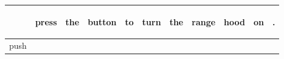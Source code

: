\documentclass[landscape]{article}
\newcommand{\ssp}{\hspace{2pt}}
\begin{document}
\noindent\begin{tabular}{|l|p{10pt}|p{10pt}|p{10pt}|p{10pt}|p{10pt}|p{10pt}|p{10pt}|p{10pt}|p{10pt}|p{10pt}|}
\hline
&\begin{sideways}\cellcolor{ref0}press\hspace{12pt}\end{sideways}&\begin{sideways}\cellcolor{ref1}the\hspace{12pt}\end{sideways}&\begin{sideways}\cellcolor{ref2}button\hspace{12pt}\end{sideways}&\begin{sideways}\cellcolor{ref3}to\hspace{12pt}\end{sideways}&\begin{sideways}\cellcolor{ref4}turn\hspace{12pt}\end{sideways}&\begin{sideways}\cellcolor{ref5}the\hspace{12pt}\end{sideways}&\begin{sideways}\cellcolor{ref6}range\hspace{12pt}\end{sideways}&\begin{sideways}\cellcolor{ref7}hood\hspace{12pt}\end{sideways}&\begin{sideways}\cellcolor{ref8}on\hspace{12pt}\end{sideways}&\begin{sideways}\cellcolor{ref9}.\hspace{12pt}\end{sideways}\\
\hline
\ssp push \ssp&\hspace{2pt}&\hspace{2pt}&\hspace{2pt}&\hspace{2pt}&\hspace{2pt}&\hspace{2pt}&\hspace{2pt}&\hspace{2pt}&\hspace{2pt}&\hspace{2pt}\\

\end{tabular}
\end{document}
